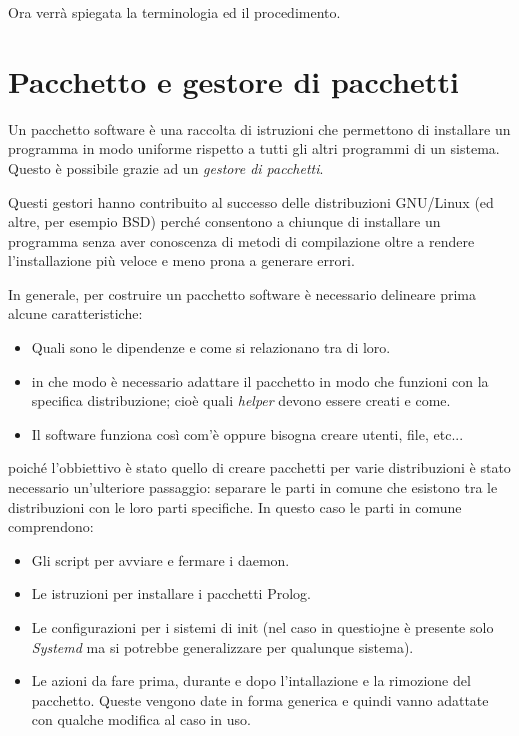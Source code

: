 \documentclass[10pt,titlepage,twoside,a4paper]{report}
\begin{document}
Ora verrà spiegata la terminologia ed il procedimento.


\section{Pacchetto e gestore di pacchetti} \label{pacchetto-e-gestore-di-pacchetti}
Un pacchetto software è una raccolta di istruzioni che permettono di 
installare un programma in modo uniforme rispetto a tutti gli altri programmi 
di un sistema. Questo è possibile grazie ad un \emph{gestore di 
pacchetti}.

Questi gestori hanno contribuito al successo delle distribuzioni GNU/Linux (ed 
altre, per esempio BSD) perché consentono a chiunque di installare un 
programma senza aver conoscenza di metodi di compilazione oltre a rendere 
l'installazione più veloce e meno prona a generare errori.

In generale, per costruire un pacchetto software è necessario delineare prima 
alcune caratteristiche:
\begin{itemize}
    \item Quali sono le dipendenze e come si relazionano tra di loro.
    \item in che modo è necessario adattare il pacchetto in modo che funzioni 
          con la specifica distribuzione; cioè quali \emph{helper} devono 
essere creati e come.
    \item Il software funziona così com'è oppure bisogna creare utenti, 
file, etc...
\end{itemize}

poiché l'obbiettivo è stato quello di creare pacchetti per varie 
distribuzioni è stato necessario un'ulteriore passaggio: separare le parti in 
comune che esistono tra le distribuzioni con le loro parti specifiche. In 
questo caso le parti in comune comprendono:
\begin{itemize}
    \item Gli script per avviare e fermare i daemon.
    \item Le istruzioni per installare i pacchetti Prolog.
    \item Le configurazioni per i sistemi di init (nel caso in questiojne è 
presente solo \emph{Systemd} ma si potrebbe generalizzare per qualunque 
sistema).
    \item Le azioni da fare prima, durante e dopo l'intallazione e la rimozione 
del pacchetto. Queste vengono date in forma generica e quindi vanno adattate 
con qualche modifica al caso in uso.
\end{itemize}
\end{document}
